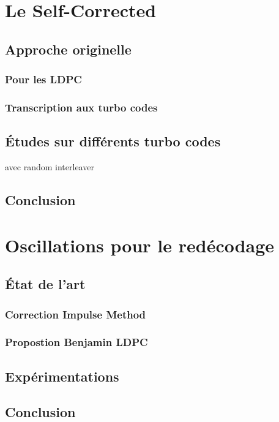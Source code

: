 \section{Le Self-Corrected} %
\label{sec:le_self_corrected}

\subsection{Approche originelle} %
\label{sub:approche_originelle}

\subsubsection{Pour les LDPC} %
\label{ssub:pour_les_ldpc}

\subsubsection{Transcription aux turbo codes} %
\label{ssub:transcription_aux_turbo_codes}

\subsection{Études sur différents turbo codes} %
\label{sub:_tudes_sur_diff_rents_turbo_codes}
avec random interleaver

\subsection{Conclusion} %
\label{sub:conclusion}

\section{Oscillations pour le redécodage} %
\label{sec:Oscillations pour le redécodage}

\subsection{État de l'art} %
\label{sub:_tat_de_l_art}

\subsubsection{Correction Impulse Method} %
\label{ssub:correction_impulse_method}

\subsubsection{Propostion Benjamin LDPC} %
\label{ssub:propostion_benjamin_ldpc}

\subsection{Expérimentations} %
\label{sub:exp_rimentations}

\subsection{Conclusion} %
\label{sub:conclusion}


